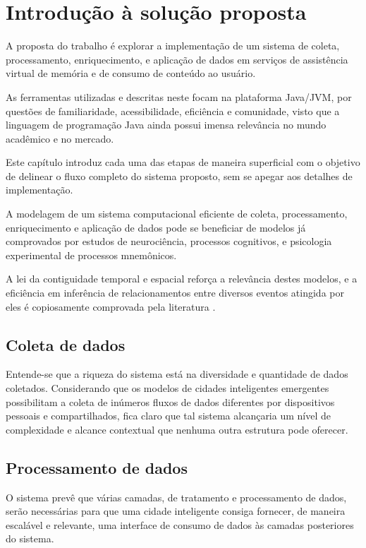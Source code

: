 \chapter{Introdução à solução proposta} \label{c:introducao_a_solucao_proposta}

A proposta do trabalho é explorar a implementação de um sistema de coleta, processamento, enriquecimento, e aplicação de dados em serviços de assistência virtual de memória e de consumo de conteúdo ao usuário.

As ferramentas utilizadas e descritas neste focam na plataforma Java/JVM, por questões de familiaridade, acessibilidade, eficiência e comunidade, visto que a linguagem de programação Java ainda possui imensa relevância no mundo acadêmico e no mercado.

Este capítulo introduz cada uma das etapas de maneira superficial com o objetivo de delinear o fluxo completo do sistema proposto, sem se apegar aos detalhes de implementação.

A modelagem de um sistema computacional eficiente de coleta, processamento, enriquecimento e aplicação de dados pode se beneficiar de modelos já comprovados por estudos de neurociência, processos cognitivos, e psicologia experimental de processos mnemônicos.

A lei da contiguidade temporal e espacial reforça a relevância destes modelos, e a eficiência em inferência de relacionamentos entre diversos eventos atingida por eles é copiosamente comprovada pela literatura \cite{Polyn2011SemanticCA}.

\section{Coleta de dados} \label{s:coleta_de_dados}

Entende-se que a riqueza do sistema está na diversidade e quantidade de dados coletados. Considerando que os modelos de cidades inteligentes emergentes possibilitam a coleta de inúmeros fluxos de dados diferentes por dispositivos pessoais e compartilhados, fica claro que tal sistema alcançaria um nível de complexidade e alcance contextual que nenhuma outra estrutura pode oferecer. 

\section{Processamento de dados} \label{s:processamento_de_dados}

O sistema prevê que várias camadas, de tratamento e processamento de dados, serão necessárias para que uma cidade inteligente consiga fornecer, de maneira escalável e relevante, uma interface de consumo de dados às camadas posteriores do sistema.

